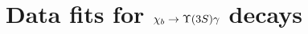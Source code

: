 \section{Data fits for \texorpdfstring{$\chib \to \Y3S \gamma$}{chib --> Y(3S) gamma} decays}
\label{sec:chib:ups3s:fits}


